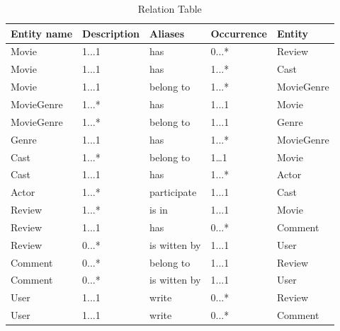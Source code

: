 \documentclass[12pt]{article}
\begin{document}
\begin{table}[H]
\centering
\renewcommand\arraystretch{1.08}
\caption{Relation Table}
	\begin{tabular}{|l l l l l|}
	    \hline
	    Entity name & Description& Aliases & Occurrence &Entity\\
        \hline
        Movie&	 1...1&	 has&	 0...*&	Review\\
        Movie&	 1...1&	has&	 1...*&	Cast\\
        Movie&	 1...1&	belong to&	 1...*&	MovieGenre\\
        MovieGenre&	 1...*&	has& 1...1&	Movie\\
        MovieGenre&	 1...*&	belong to&	 1...1&	Genre\\
        Genre&	 1...1&	has& 1...*&	MovieGenre\\
        Cast&	1...*&	belong to& 	1…1	&Movie\\
        Cast&	 1...1&	has&	 1...*&	Actor\\
        Actor&	1...*&	participate&	 1...1&	Cast\\
        Review&	 1...*&	is in&	 1...1&	Movie\\
        Review&	 1...1&	has&	 0...*&	Comment\\
        Review&	 0...*&	is witten by&	 1...1&	User\\
        Comment&	 0...*&	belong to&	 1...1&	Review\\
        Comment& 0...*&	is witten by&	 1...1&	User\\
        User&	 1...1&	write&	 0...*&	Review\\
        User&	 1...1&	write&	 0...*&	Comment\\
        \hline
	\end{tabular}
\end{table}
\end{document}
